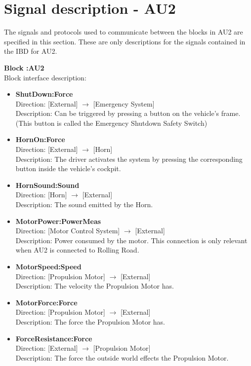 \section{Signal description - AU2}
The signals and protocols used to communicate between the blocks in AU2 are specified in this section. These are only descriptions for the signals contained in the IBD for AU2.

\textbf{Block :AU2}\\
Block interface description:
\begin{itemize}
	\item \textbf{ShutDown:Force}\\
	Direction: [External] $\rightarrow$ [Emergency System]\\
	Description: Can be triggered by pressing a button on the vehicle's frame. (This button is called the Emergency Shutdown Safety Switch)	
	\item \textbf{HornOn:Force}\\
	Direction: [External] $\rightarrow$ [Horn]\\
	Description: The driver activates the system by pressing the corresponding button inside the vehicle's cockpit.
	\item \textbf{HornSound:Sound}\\
	Direction: [Horn] $\rightarrow$ [External]\\
	Description: The sound emitted by the Horn.
	\item \textbf{MotorPower:PowerMeas}\\
	Direction: [Motor Control System] $\rightarrow$ [External]\\
	Description: Power consumed by the motor. This connection is only relevant when AU2 is connected to Rolling Road.
	\item \textbf{MotorSpeed:Speed}\\
	Direction: [Propulsion Motor] $\rightarrow$ [External]\\
	Description: The velocity the Propulsion Motor has.
	\item \textbf{MotorForce:Force}\\
	Direction: [Propulsion Motor] $\rightarrow$ [External]\\
	Description: The force the Propulsion Motor has.
	\item \textbf{ForceResistance:Force}\\
	Direction: [External] $\rightarrow$ [Propulsion Motor]\\
	Description: The force the outside world effects the Propulsion Motor.

\end{itemize}
